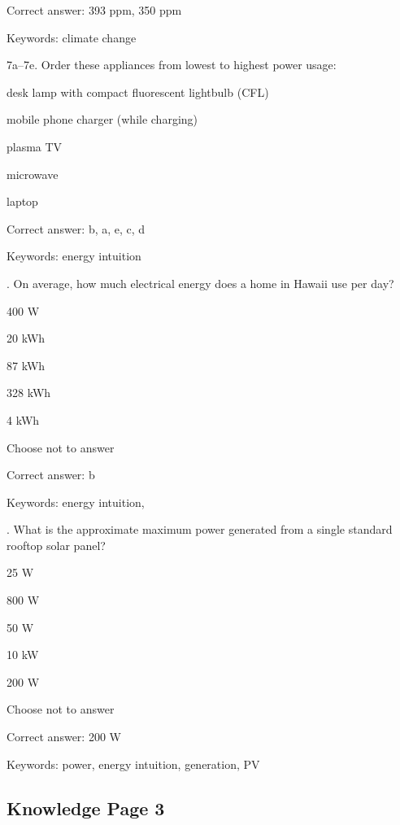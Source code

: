 Correct answer: 393 ppm, 350 ppm

Keywords: climate change

\vspace{5 mm}
\noindent
7a--7e. Order these appliances from lowest to highest power usage:

\begin{answer}
	\item desk lamp with compact fluorescent lightbulb (CFL)
	\item mobile phone charger (while charging)
	\item plasma TV
	\item microwave
	\item laptop
\end{answer}

Correct answer: b, a, e, c, d

Keywords: energy intuition

\vspace{5 mm}
. On average, how much electrical energy does a home in Hawaii use per day?

\begin{answer}
	\item 400 W
	\item 20 kWh
	\item 87 kWh
	\item 328 kWh
	\item 4 kWh
	\item Choose not to answer
\end{answer}

Correct answer: b

Keywords: energy intuition, \Hawaii

\vspace{5 mm}
. What is the approximate maximum power generated from a single standard rooftop solar panel?

\begin{answer}
	\item 25 W
	\item 800 W
	\item 50 W
	\item 10 kW
	\item 200 W
	\item Choose not to answer
\end{answer}

Correct answer: 200 W

Keywords: power, energy intuition, generation, PV


\subsection{Knowledge Page 3}

